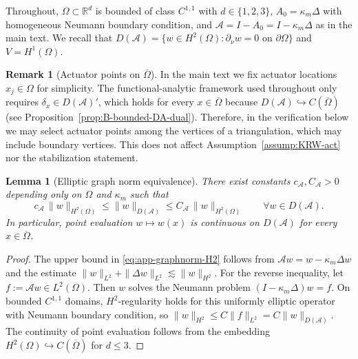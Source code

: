 \documentclass[11pt,a4paper]{article}
\numberwithin{equation}{section}
\newtheorem{lemma}[theorem]{Lemma}
\theoremstyle{definition}
\newtheorem{remark}[theorem]{Remark}
\newcommand{\R}{\mathbb{R}}
\newcommand{\1}{\mathbbm{1}}
\begin{document}
\medskip

\noindent
Throughout, $\Omega\subset\R^d$ is bounded of class $C^{1,1}$ with $d\in\{1,2,3\}$, $A_0=\kappa_m\Delta$ with
homogeneous Neumann boundary condition, and $\mathcal A=I-A_0=I-\kappa_m\Delta$ as in the main text.
We recall that $D(\mathcal A)=\{w\in H^2(\Omega):\partial_\nu w=0\text{ on }\partial\Omega\}$ and
$V=H^1(\Omega)$.

\begin{remark}[Actuator points on $\overline\Omega$] 
\label{rem:app-KRW-closure}
In the main text we fix actuator locations $x_j\in\Omega$ for simplicity. The functional-analytic framework used
throughout only requires $\delta_x\in D(\mathcal A)'$, which holds for every $x\in\overline\Omega$ because
$D(\mathcal A)\hookrightarrow C(\overline\Omega)$ (see Proposition~\ref{prop:B-bounded-DA-dual}).
Therefore, in the verification below we may select actuator points among the vertices of a triangulation, which may
include boundary vertices. This does not affect Assumption~\ref{assump:KRW-act} nor the stabilization statement.
\end{remark}

\begin{lemma}[Elliptic graph norm equivalence]
\label{lem:app-graphnorm-H2}
There exist constants $c_\mathcal{A},C_\mathcal{A}>0$ depending only on $\Omega$ and $\kappa_m$ such that
\begin{equation}
\label{eq:app-graphnorm-H2}
c_\mathcal{A}\,\|w\|_{H^2(\Omega)} \le \|w\|_{D(\mathcal A)} \le C_\mathcal{A}\,\|w\|_{H^2(\Omega)}
\qquad \forall w\in D(\mathcal A).
\end{equation}
In particular, point evaluation $w\mapsto w(x)$ is continuous on $D(\mathcal A)$ for every $x\in\overline\Omega$.
\end{lemma}

\begin{proof}
The upper bound in \eqref{eq:app-graphnorm-H2} follows from $\mathcal A w=w-\kappa_m\Delta w$ and the estimate
$\|w\|_{L^2}+\|\Delta w\|_{L^2}\lesssim\|w\|_{H^2}$. For the reverse inequality, let $f:=\mathcal A w\in L^2(\Omega)$.
Then $w$ solves the Neumann problem $(I-\kappa_m\Delta)w=f$.
On bounded $C^{1,1}$ domains, $H^2$-regularity holds for this uniformly elliptic operator with Neumann boundary condition,
so $\|w\|_{H^2}\le C\|f\|_{L^2}=C\|w\|_{D(\mathcal A)}$.
The continuity of point evaluation follows from the embedding $H^2(\Omega)\hookrightarrow C(\overline\Omega)$ for $d\le3$.
\end{proof}
\end{document}

